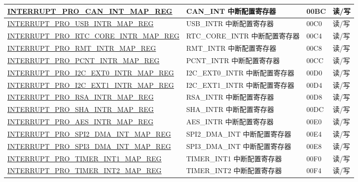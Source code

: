 \begin{longtable}{ | m{9.3cm} | m{9.2cm} | m{1.3cm} | m{1.2cm} | }
\hyperref[regdesc:INTERRUPTPROCANINTMAPREG]{INTERRUPT\_PRO\_CAN\_INT\_MAP\_REG} & CAN\_INT 中断配置寄存器 & \hexprefix{}00BC &读/写 \\ \hline
\hyperref[regdesc:INTERRUPTPROUSBINTRMAPREG]{INTERRUPT\_PRO\_USB\_INTR\_MAP\_REG} & USB\_INTR 中断配置寄存器 & \hexprefix{}00C0 &读/写 \\ \hline
\hyperref[regdesc:INTERRUPTPRORTCCOREINTRMAPREG]{INTERRUPT\_PRO\_RTC\_CORE\_INTR\_MAP\_REG} & RTC\_CORE\_INTR 中断配置寄存器 & \hexprefix{}00C4 &读/写 \\ \hline
\hyperref[regdesc:INTERRUPTPRORMTINTRMAPREG]{INTERRUPT\_PRO\_RMT\_INTR\_MAP\_REG} & RMT\_INTR 中断配置寄存器 & \hexprefix{}00C8 &读/写 \\ \hline
\hyperref[regdesc:INTERRUPTPROPCNTINTRMAPREG]{INTERRUPT\_PRO\_PCNT\_INTR\_MAP\_REG} & PCNT\_INTR 中断配置寄存器 & \hexprefix{}00CC &读/写 \\ \hline
\hyperref[regdesc:INTERRUPTPROI2CEXT0INTRMAPREG]{INTERRUPT\_PRO\_I2C\_EXT0\_INTR\_MAP\_REG} & I2C\_EXT0\_INTR 中断配置寄存器 & \hexprefix{}00D0 &读/写 \\ \hline
\hyperref[regdesc:INTERRUPTPROI2CEXT1INTRMAPREG]{INTERRUPT\_PRO\_I2C\_EXT1\_INTR\_MAP\_REG} & I2C\_EXT1\_INTR 中断配置寄存器 & \hexprefix{}00D4 &读/写 \\ \hline
\hyperref[regdesc:INTERRUPTPRORSAINTRMAPREG]{INTERRUPT\_PRO\_RSA\_INTR\_MAP\_REG} & RSA\_INTR 中断配置寄存器 & \hexprefix{}00D8 &读/写 \\ \hline
\hyperref[regdesc:INTERRUPTPROSHAINTRMAPREG]{INTERRUPT\_PRO\_SHA\_INTR\_MAP\_REG} & SHA\_INTR 中断配置寄存器 & \hexprefix{}00DC &读/写 \\ \hline
\hyperref[regdesc:INTERRUPTPROAESINTRMAPREG]{INTERRUPT\_PRO\_AES\_INTR\_MAP\_REG} & AES\_INTR 中断配置寄存器 & \hexprefix{}00E0 &读/写 \\ \hline
\hyperref[regdesc:INTERRUPTPROSPI2DMAINTMAPREG]{INTERRUPT\_PRO\_SPI2\_DMA\_INT\_MAP\_REG} & SPI2\_DMA\_INT 中断配置寄存器 & \hexprefix{}00E4 &读/写 \\ \hline
\hyperref[regdesc:INTERRUPTPROSPI3DMAINTMAPREG]{INTERRUPT\_PRO\_SPI3\_DMA\_INT\_MAP\_REG} & SPI3\_DMA\_INT 中断配置寄存器 & \hexprefix{}00E8 &读/写 \\ \hline
\hyperref[regdesc:INTERRUPTPROTIMERINT1MAPREG]{INTERRUPT\_PRO\_TIMER\_INT1\_MAP\_REG} & TIMER\_INT1 中断配置寄存器 & \hexprefix{}00F0 &读/写 \\ \hline
\hyperref[regdesc:INTERRUPTPROTIMERINT2MAPREG]{INTERRUPT\_PRO\_TIMER\_INT2\_MAP\_REG} & TIMER\_INT2 中断配置寄存器 & \hexprefix{}00F4 &读/写 \\ \hline

\end{longtable}
